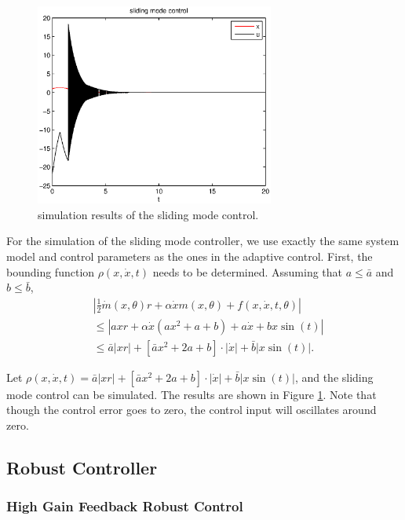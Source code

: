 \documentclass[12pt,a4paper]{article}
\begin{document}
\begin{figure}
  \centering
  \includegraphics[width=0.7\textwidth]{figs/sliding_mode_control.eps}%
  \caption{simulation results of the sliding mode control.}
  \label{sliding_mode}
\end{figure}

\indent For the simulation of the sliding mode controller, we use exactly the same system model and control parameters as the ones in the adaptive control. First, the bounding function $\rho(x,\dot x,t)$ needs to be determined. Assuming that $a\le \bar a$ and $b\le\bar b$, 
\begin{equation}
\begin{aligned}
&\left|\frac12\dot m(x,\theta)r+\alpha\dot xm(x,\theta)+f(x,\dot x,t,\theta)\right|\\
&\le \left| axr+\alpha\dot x(ax^2+a+b)+a\dot x+bx\sin(t) \right|\\
&\le \bar a|xr|+[\bar ax^2+2a+b]\cdot |\dot x|+\bar b |x \sin (t)|.
\end{aligned}
\end{equation}

Let $\rho(x,\dot x,t)=\bar a|xr|+[\bar ax^2+2a+b]\cdot |\dot x|+\bar b |x \sin (t)|$, and the sliding mode control can be simulated. The results are shown in Figure \ref{sliding_mode}. Note that though the control error goes to zero, the control input will oscillates around zero.


\subsection{Robust Controller}

\subsubsection{High Gain Feedback Robust Control}
\end{document}
